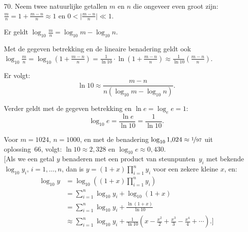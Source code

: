\begin{problem}{70.}
	Neem twee natuurlijke getallen $m$ en $n$ die ongeveer even groot zijn: $\frac{m}{n} = 1 + \frac{m - n}{n} \approx 1$ en $0 < \lvert \frac{m - n}{n} \rvert \ll 1$.

    Er geldt $\log_{10} \frac{m}{n} = \log_{10} m - \log_{10} n$.

    Met de gegeven betrekking en de lineaire benadering geldt ook $\log_{10} \frac{m}{n} = \log_{10} (1 + \frac{m - n}{n}) = \frac{1}{\ln 10} \cdot \ln (1 + \frac{m - n}{n}) \approx \frac{1}{\ln 10} \left( \frac{m - n}{n} \right)$.

    Er volgt:
    \begin{equation*}
    	\ln 10 \approx \frac{m - n}{n (\log_{10} m - \log_{10} n)}.
    \end{equation*}

    Verder geldt met de gegeven betrekking en $\ln e = \log_e e = 1$:
    \begin{equation*}
	    \log_{10} e = \frac{\ln e}{\ln 10} = \frac{1}{\ln 10}.
    \end{equation*}

    Voor $m = 1024$, $n = 1000$, en met de benadering $\log_{10} 1{,}024 \approx \nicefrac{1}{97}$ uit oplossing~66, volgt: $\ln 10 \approx 2{,}328$ en $\log_{10} e \approx 0{,}430$.\\

    [Als we een getal $y$ benaderen met een product van steunpunten~$y_i$ met bekende $\log_{10} y_i$, $i = 1,\dotsc,n$, dan is $y = (1 + x) \prod\limits_{i=1}^{n} y_{i}$ voor een zekere kleine $x$, en:
    \begin{equation*}
    \begin{split}
		\log_{10} y & = \log_{10} \left( (1 + x) \textstyle\prod\limits_{i=1}^{n} y_{i} \right) \\
		            & = \textstyle\sum\limits_{i=1}^{n} \log_{10} y_{i} + \log_{10} (1 + x) \\
		            & = \textstyle\sum\limits_{i=1}^{n} \log_{10} y_{i} + \frac{\ln (1 + x)}{\ln 10} \\
		            & \approx \textstyle\sum\limits_{i=1}^{n} \log_{10} y_{i} + \frac{1}{\ln 10} \left( x - \frac{x^2}{2} + \frac{x^3}{3} - \frac{x^4}{4} + \dotsb \right).]
    \end{split}
	\end{equation*}
\end{problem}

\clearpage

